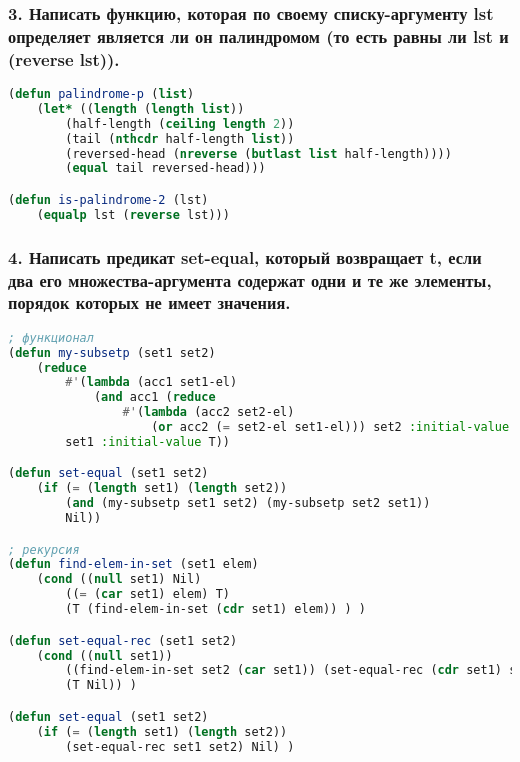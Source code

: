 \newpage
\subsubsection*{3. Написать функцию, которая по своему списку-аргументу lst определяет является ли он палиндромом (то есть равны ли lst и (reverse lst)).}
\begin{lstlisting}[language=Lisp]
(defun palindrome-p (list)
	(let* ((length (length list))
		(half-length (ceiling length 2))
		(tail (nthcdr half-length list))
		(reversed-head (nreverse (butlast list half-length))))
		(equal tail reversed-head)))

(defun is-palindrome-2 (lst)
	(equalp lst (reverse lst)))
\end{lstlisting}

\subsubsection*{4. Написать предикат set-equal, который возвращает t, если два его множества-аргумента содержат одни и те же элементы, порядок которых не имеет значения.}
\begin{lstlisting}[language=Lisp]
; функционал 
(defun my-subsetp (set1 set2)
	(reduce
		#'(lambda (acc1 set1-el)
			(and acc1 (reduce
				#'(lambda (acc2 set2-el)
					(or acc2 (= set2-el set1-el))) set2 :initial-value Nil)))
		set1 :initial-value T))

(defun set-equal (set1 set2)
	(if (= (length set1) (length set2))
		(and (my-subsetp set1 set2) (my-subsetp set2 set1))
		Nil))

; рекурсия 
(defun find-elem-in-set (set1 elem) 
	(cond ((null set1) Nil)
		((= (car set1) elem) T)
		(T (find-elem-in-set (cdr set1) elem)) ) )

(defun set-equal-rec (set1 set2) 
	(cond ((null set1))
		((find-elem-in-set set2 (car set1)) (set-equal-rec (cdr set1) set2))
		(T Nil)) )

(defun set-equal (set1 set2)
	(if (= (length set1) (length set2)) 
		(set-equal-rec set1 set2) Nil) )
\end{lstlisting}

\newpage
